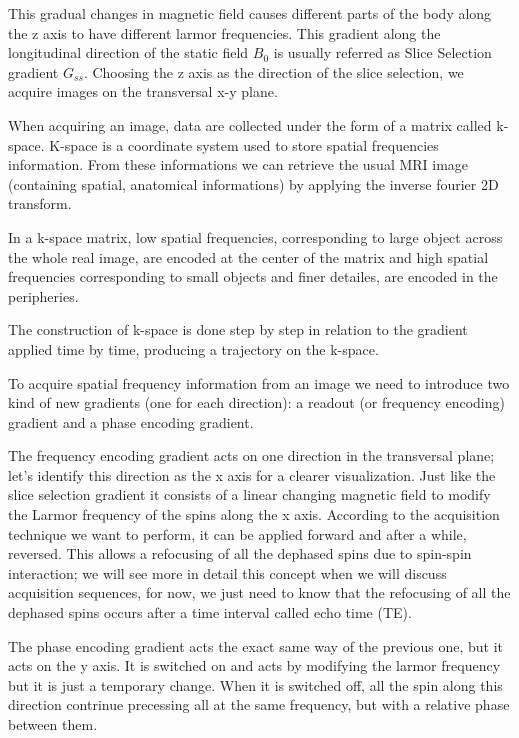 \documentclass[10pt]{report}
\begin{document}
This gradual changes in magnetic field causes different parts of the body along the z axis to have different larmor frequencies.
This gradient along the longitudinal direction of the static field $B_0$ is usually referred as Slice Selection gradient $G_{ss}$.
Choosing the z axis as the direction of the slice selection, we acquire images on the transversal x-y plane.


When acquiring an image, data are collected under the form of a matrix called k-space.
K-space is a coordinate system used to store spatial frequencies information. From these informations we can retrieve the usual MRI image (containing spatial, anatomical informations) by applying the inverse fourier 2D transform.

In a k-space matrix, low spatial frequencies, corresponding to large object across the whole real image, are encoded at the center of the matrix and high spatial frequencies corresponding to small objects and finer detailes, are encoded in the peripheries.

The construction of k-space is done step by step in relation to the gradient applied time by time, producing a trajectory on the k-space.

To acquire spatial frequency information from an image we need to introduce two kind of new gradients (one for each direction): a readout (or frequency encoding) gradient and a phase encoding gradient.

The frequency encoding gradient acts on one direction in the transversal plane; let's identify this direction as the x axis for a clearer visualization.
Just like the slice selection gradient it consists of a linear changing magnetic field to modify the Larmor frequency of the spins along the x axis. According to the acquisition technique we want to perform, it can be applied forward and after a while, reversed. This allows a refocusing of all the dephased spins due to spin-spin interaction; we will see more in detail this concept when we will discuss acquisition sequences, for now, we just need to know that the refocusing of all the dephased spins occurs after a time interval called echo time (TE).

The phase encoding gradient acts the exact same way of the previous one, but it acts on the y axis. It is switched on and acts by modifying the larmor frequency but it is just a temporary change. When it is switched off, all the spin along this direction contrinue precessing all at the same frequency, but with a relative phase between them.
\end{document}
